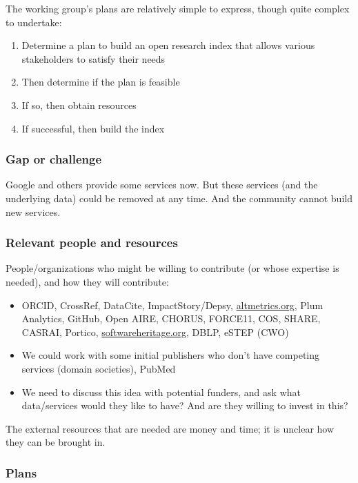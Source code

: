 The working group's plans are relatively simple to express, though quite complex to undertake:

\begin{enumerate}
\item Determine a plan to build an open research index that allows various stakeholders to satisfy their needs
\item Then determine if the plan is feasible
\item If so, then obtain resources
\item If successful, then build the index
\end{enumerate}

\subsubsection{Gap or challenge}

Google and others provide some services now.
But these services (and the underlying data) could be removed at any time.
And the community cannot build new services.

\subsubsection{Relevant people and resources}

People/organizations who might be willing to contribute (or whose expertise is needed), and how they will contribute:

\begin{itemize}
\item ORCID, CrossRef, DataCite, ImpactStory/Depsy, \url{altmetrics.org}, Plum Analytics, GitHub, Open AIRE, CHORUS, FORCE11, COS, SHARE, CASRAI, Portico, \url{softwareheritage.org}, DBLP, eSTEP (CWO)
\item We could work with some initial publishers who don't have competing services (domain societies), PubMed
\item We need to discuss this idea with potential funders, and ask what data/services would they like to have?  And are they willing to invest in this?
\end{itemize}

The external resources that are needed are money and time; it is unclear how they can be brought in.

\subsubsection{Plans}

